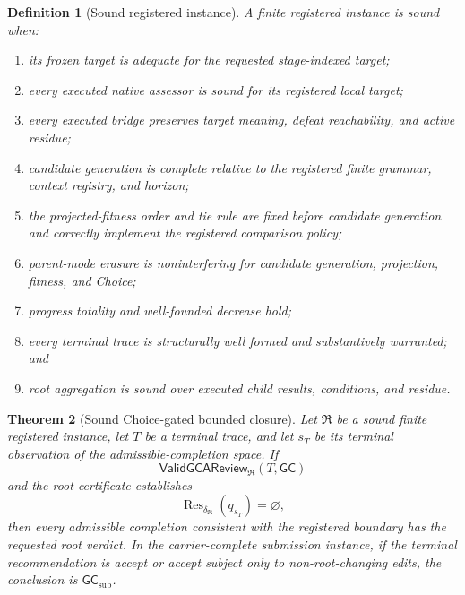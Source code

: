 \documentclass[10pt]{article}
\newtheorem{definition}{Definition}[section]
\newtheorem{theorem}[definition]{Theorem}
\newcommand{\Res}{\operatorname{Res}}
\newcommand{\GC}{\mathsf{GC}}
\newcommand{\ValidReview}{\mathsf{ValidGCAReview}}
\newcommand{\GCsub}{\mathsf{GC}_{\mathrm{sub}}}
\begin{document}
\begin{definition}[Sound registered instance]
A finite registered instance is sound when:
\begin{enumerate}
  \item its frozen target is adequate for the requested stage-indexed target;
  \item every executed native assessor is sound for its registered local target;
  \item every executed bridge preserves target meaning, defeat reachability, and active residue;
  \item candidate generation is complete relative to the registered finite grammar, context registry, and horizon;
  \item the projected-fitness order and tie rule are fixed before candidate generation and correctly implement the registered comparison policy;
  \item parent-mode erasure is noninterfering for candidate generation, projection, fitness, and Choice;
  \item progress totality and well-founded decrease hold;
  \item every terminal trace is structurally well formed and substantively warranted; and
  \item root aggregation is sound over executed child results, conditions, and residue.
\end{enumerate}
\end{definition}

\begin{theorem}[Sound Choice-gated bounded closure]\label{thm:sound-closure}
Let $\mathfrak R$ be a sound finite registered instance, let $T$ be a terminal trace, and let $s_T$ be its terminal observation of the admissible-completion space.  If
\[
  \ValidReview_{\mathfrak R}(T,\GC)
\]
and the root certificate establishes
\[
  \Res_{\delta_{\mathfrak R}}(q_{s_T})=\varnothing,
\]
then every admissible completion consistent with the registered boundary has the requested root verdict.  In the carrier-complete submission instance, if the terminal recommendation is accept or accept subject only to non-root-changing edits, the conclusion is $\GCsub$.
\end{theorem}
\end{document}
